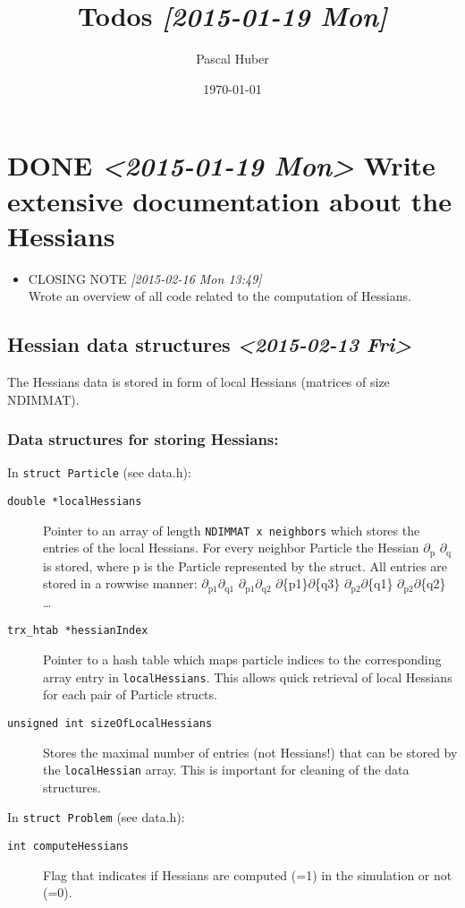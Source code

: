 \documentclass[11pt]{article}
\author{Pascal Huber}
\date{\today}
\title{Todos \textit{[2015-01-19 Mon]}}
\begin{document}
\maketitle
\tableofcontents

\section{{\bfseries\sffamily DONE} \textit{<2015-01-19 Mon>} Write extensive documentation about the Hessians}
\label{sec-1}
\begin{itemize}
\item CLOSING NOTE \textit{[2015-02-16 Mon 13:49]} \\
     Wrote an overview of all code related to the computation of Hessians.
\end{itemize}
\subsection{Hessian data structures \textit{<2015-02-13 Fri>}}
\label{sec-1-1}
The Hessians data is stored in form of local Hessians (matrices of size NDIMMAT).
\subsubsection{Data structures for storing Hessians:}
\label{sec-1-1-1}
In \texttt{struct Particle} (see data.h):
\begin{description}
\item[{\texttt{double *localHessians}}] Pointer to an array of length \texttt{NDIMMAT x neighbors} which stores the entries of the local Hessians.
For every neighbor Particle the Hessian $\partial$$_{\text{p}}$ $\partial$$_{\text{q}}$ is stored, where p is the Particle represented by the struct.
All entries are stored in a rowwise manner: $\partial$$_{\text{p1}}$$\partial$$_{\text{q1}}$ $\partial$$_{\text{p1}}$$\partial$$_{\text{q2}}$ $\partial$\{p1\}$\partial$\{q3\} $\partial$$_{\text{p2}}$$\partial$\{q1\} $\partial$$_{\text{p2}}$$\partial$\{q2\} \ldots{}
\item[{\texttt{trx\_htab *hessianIndex}}] Pointer to a hash table which maps particle indices to the corresponding array entry in \texttt{localHessians}. This allows quick retrieval of local Hessians for each pair of Particle structs.
\item[{\texttt{unsigned int sizeOfLocalHessians}}] Stores the maximal number of entries (not Hessians!) that can be stored by the \texttt{localHessian} array. This is important for cleaning of the data structures.
\end{description}
In \texttt{struct Problem} (see data.h):
\begin{description}
\item[{\texttt{int computeHessians}}] Flag that indicates if Hessians are computed (=1) in the simulation or not (=0).
\end{description}
\end{document}
